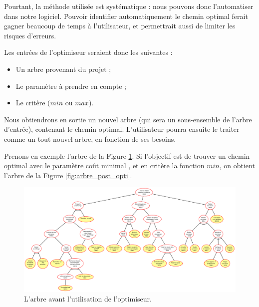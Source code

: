		Pourtant, la méthode utilisée est systématique : nous pouvons donc l'automatiser dans notre logiciel. Pouvoir identifier automatiquement le chemin optimal ferait gagner beaucoup de temps à l'utilisateur, et permettrait aussi de limiter les risques d'erreurs.

		Les entrées de l'optimiseur seraient donc les suivantes :
		\begin{itemize}
			\item Un arbre provenant du projet ;
			\item Le paramètre à prendre en compte ;
			\item Le critère ($min$ ou $max$).
		\end{itemize}

		Nous obtiendrons en sortie un nouvel arbre (qui sera un sous-ensemble de l'arbre d'entrée), contenant le chemin optimal. L'utilisateur pourra ensuite le traiter comme un tout nouvel arbre, en fonction de ses besoins.
		
		Prenons en exemple l'arbre de la {\sc Figure} \ref{fig:pre_optimiseur}. Si l'objectif est de trouver un chemin optimal avec le paramètre \og coût minimal \fg{}, et en critère la fonction $min$, on obtient l'arbre de la {\sc Figure} \ref{fig:arbre_post_opti}.
		
	\begin{landscape}
        \begin{figure}
            \includegraphics[height=0.82\textwidth]{figure/pre_optimiseur.pdf}
            \caption{L'arbre avant l'utilisation de l'optimiseur.}
            \label{fig:pre_optimiseur}
        \end{figure}
    	\end{landscape}		
		
